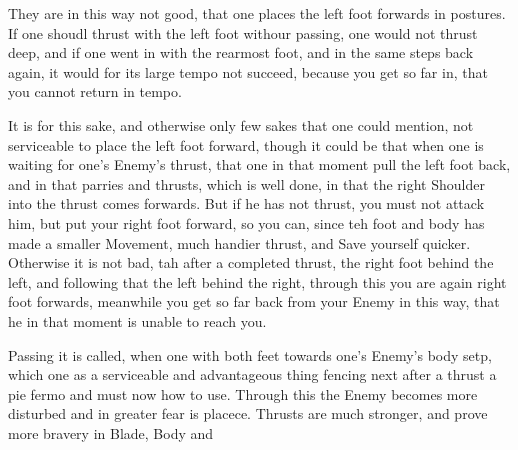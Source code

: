 They are in this way not good, that one places the left foot forwards
in postures. If one shoudl thrust with the left foot withour passing,
one would not thrust deep, and if one went in with the rearmost foot,
and in the same steps back again, it would for its large tempo not
succeed, because you get so far in, that you cannot return in tempo.


It is for this sake, and otherwise only few sakes that one could
mention, not serviceable to place the left foot forward, though it
could be that when one is waiting for one's Enemy's thrust, that one
in that moment pull the left foot back, and in that parries and
thrusts, which is well done, in that the right Shoulder into the thrust
comes forwards. But if he has not thrust, you must not attack him, but
put your right foot forward, so you can, since teh foot and body has
made a smaller Movement, much handier thrust, and Save yourself
quicker. Otherwise it is not bad, tah after a completed thrust, the
right foot behind the left, and following that the left behind the
right, through this you are again right foot forwards, meanwhile you
get so far back from your Enemy in this way, that he in that moment is
unable to reach you.




Passing it is called, when one with both feet towards one's Enemy's
body setp, which one as a serviceable and advantageous thing fencing
next after a thrust a pie fermo and must now how to use. Through this
the Enemy becomes more disturbed and in greater fear is
placece. Thrusts are much stronger, and prove more
bravery in Blade, Body and
